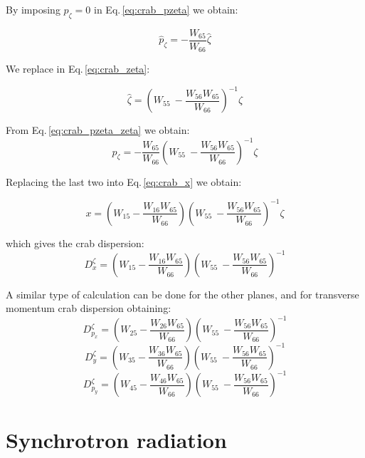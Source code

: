 By imposing $p_\zeta = 0$ in Eq.\,\ref{eq:crab_pzeta} we obtain:

\begin{equation}
\hat{p}_\zeta = - \frac{W_{65}}{W_{66}}\hat{\zeta}
\label{eq:crab_pzeta_zeta}
\end{equation}

We replace in Eq.\,\ref{eq:crab_zeta}:

\begin{equation}
\hat{\zeta} = \left( W_{55}\ -  \frac{W_{56}W_{65}}{W_{66}} \right)^{-1}\zeta
\end{equation}

From Eq.\,\ref{eq:crab_pzeta_zeta} we obtain:
\begin{equation}
\hat{p}_\zeta = - \frac{W_{65}}{W_{66}}\left( W_{55}\ -  \frac{W_{56}W_{65}}{W_{66}} \right)^{-1} \zeta
\end{equation}

Replacing the last two into Eq.\,\ref{eq:crab_x} we obtain:

\begin{equation}
x = \left(W_{15} -\frac{W_{16}W_{65}}{W_{66}}\right)\left( W_{55}\ -  \frac{W_{56}W_{65}}{W_{66}} \right)^{-1} \zeta
\end{equation}

which gives the crab dispersion:
\begin{equation}
D_x^\zeta = \left(W_{15} -\frac{W_{16}W_{65}}{W_{66}}\right)\left( W_{55}\ -  \frac{W_{56}W_{65}}{W_{66}} \right)^{-1}
\end{equation}

A similar type of calculation can be done for the other planes, and for transverse momentum crab dispersion obtaining:
\begin{equation}
D_{p_x}^\zeta = \left(W_{25} -\frac{W_{26}W_{65}}{W_{66}}\right)\left( W_{55}\ -  \frac{W_{56}W_{65}}{W_{66}} \right)^{-1}
\end{equation}
\begin{equation}
D_{y}^\zeta = \left(W_{35} -\frac{W_{36}W_{65}}{W_{66}}\right)\left( W_{55}\ -  \frac{W_{56}W_{65}}{W_{66}} \right)^{-1}
\end{equation}
\begin{equation}
D_{p_y}^\zeta = \left(W_{45} -\frac{W_{46}W_{65}}{W_{66}}\right)\left( W_{55}\ -  \frac{W_{56}W_{65}}{W_{66}} \right)^{-1}
\end{equation}

\section{Synchrotron radiation}

